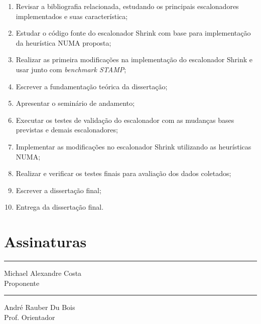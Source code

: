 \documentclass[diss-proposta,nocipinfo]{texufpel}
\begin{document}
\begin{enumerate}
  \item Revisar a bibliografia relacionada, estudando os principais escalonadores implementados e suas característica;
  \item Estudar o código fonte do escalonador Shrink com base para implementação da heurística NUMA proposta;
  \item Realizar as primeira modificações na implementação do escalonador Shrink e usar junto com \emph{benchmark STAMP};
  \item Escrever a fundamentação teórica da dissertação;
  \item Apresentar o seminário de andamento;
  \item Executar os testes de validação do escalonador com as mudanças bases previstas e demais escalonadores;
  \item Implementar as modificações no escalonador Shrink utilizando as heurísticas NUMA;
  \item Realizar e verificar os testes finais para avaliação dos dados coletados;
  \item Escrever a dissertação final;
  \item Entrega da dissertação final.
\end{enumerate}






\chapter{Assinaturas}
\vspace{2cm}

\begin{center}
\rule{8cm}{.3mm}
\medskip

	Michael Alexandre Costa\\
	Proponente

\end{center}

\vspace{4cm}

\begin{center}
\rule{8cm}{.3mm}
\medskip

	André Rauber Du Bois\\
	Prof. Orientador

\end{center}
\end{document}
